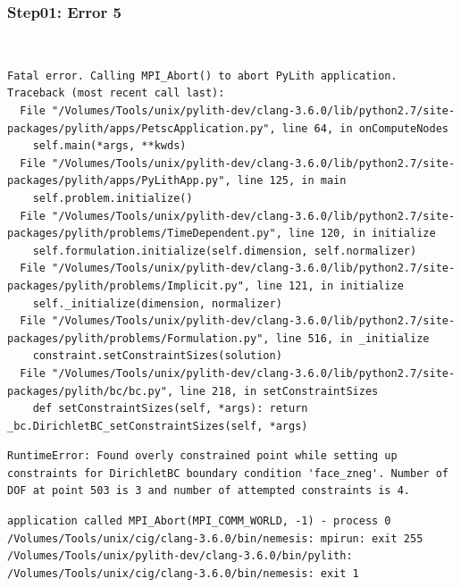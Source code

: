 \documentclass{beamer}
\begin{document}
\begin{frame}[fragile]
  \frametitle{Step01: Error 5}

\\
\begin{lstlisting}
Fatal error. Calling MPI_Abort() to abort PyLith application.
Traceback (most recent call last):
  File "/Volumes/Tools/unix/pylith-dev/clang-3.6.0/lib/python2.7/site-packages/pylith/apps/PetscApplication.py", line 64, in onComputeNodes
    self.main(*args, **kwds)
  File "/Volumes/Tools/unix/pylith-dev/clang-3.6.0/lib/python2.7/site-packages/pylith/apps/PyLithApp.py", line 125, in main
    self.problem.initialize()
  File "/Volumes/Tools/unix/pylith-dev/clang-3.6.0/lib/python2.7/site-packages/pylith/problems/TimeDependent.py", line 120, in initialize
    self.formulation.initialize(self.dimension, self.normalizer)
  File "/Volumes/Tools/unix/pylith-dev/clang-3.6.0/lib/python2.7/site-packages/pylith/problems/Implicit.py", line 121, in initialize
    self._initialize(dimension, normalizer)
  File "/Volumes/Tools/unix/pylith-dev/clang-3.6.0/lib/python2.7/site-packages/pylith/problems/Formulation.py", line 516, in _initialize
    constraint.setConstraintSizes(solution)
  File "/Volumes/Tools/unix/pylith-dev/clang-3.6.0/lib/python2.7/site-packages/pylith/bc/bc.py", line 218, in setConstraintSizes
    def setConstraintSizes(self, *args): return
_bc.DirichletBC_setConstraintSizes(self, *args)
\end{lstlisting}
\begin{lstlisting}
RuntimeError: Found overly constrained point while setting up constraints for DirichletBC boundary condition 'face_zneg'. Number of DOF at point 503 is 3 and number of attempted constraints is 4.
\end{lstlisting}
\begin{lstlisting}
application called MPI_Abort(MPI_COMM_WORLD, -1) - process 0
/Volumes/Tools/unix/cig/clang-3.6.0/bin/nemesis: mpirun: exit 255
/Volumes/Tools/unix/pylith-dev/clang-3.6.0/bin/pylith: /Volumes/Tools/unix/cig/clang-3.6.0/bin/nemesis: exit 1
\end{lstlisting}
  
\end{frame}
\end{document}
